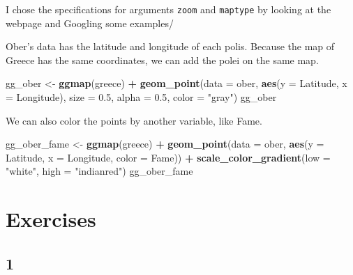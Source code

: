 \documentclass[]{book}
\newenvironment{Shaded}{\begin{snugshade}}{\end{snugshade}}
\newcommand{\DataTypeTok}[1]{\textcolor[rgb]{0.13,0.29,0.53}{#1}}
\newcommand{\FloatTok}[1]{\textcolor[rgb]{0.00,0.00,0.81}{#1}}
\newcommand{\KeywordTok}[1]{\textcolor[rgb]{0.13,0.29,0.53}{\textbf{#1}}}
\newcommand{\NormalTok}[1]{#1}
\newcommand{\OperatorTok}[1]{\textcolor[rgb]{0.81,0.36,0.00}{\textbf{#1}}}
\newcommand{\StringTok}[1]{\textcolor[rgb]{0.31,0.60,0.02}{#1}}
\theoremstyle{definition}
\theoremstyle{definition}
\theoremstyle{definition}
\theoremstyle{remark}
\begin{document}
I chose the specifications for arguments \texttt{zoom} and \texttt{maptype} by looking at the webpage and Googling some examples/

Ober's data has the latitude and longitude of each polis. Because the map of Greece has the same coordinates, we can add the polei on the same map.

\begin{Shaded}
\begin{Highlighting}[]
\NormalTok{gg_ober <-}\StringTok{ }\KeywordTok{ggmap}\NormalTok{(greece) }\OperatorTok{+}
\StringTok{  }\KeywordTok{geom_point}\NormalTok{(}\DataTypeTok{data =}\NormalTok{ ober, }
             \KeywordTok{aes}\NormalTok{(}\DataTypeTok{y =}\NormalTok{ Latitude, }\DataTypeTok{x =}\NormalTok{ Longitude), }
             \DataTypeTok{size =} \FloatTok{0.5}\NormalTok{,}
             \DataTypeTok{alpha =} \FloatTok{0.5}\NormalTok{,}
             \DataTypeTok{color =} \StringTok{"gray"}\NormalTok{)}
\NormalTok{gg_ober}
\end{Highlighting}
\end{Shaded}

We can also color the points by another variable, like Fame.

\begin{Shaded}
\begin{Highlighting}[]
\NormalTok{gg_ober_fame <-}\StringTok{ }\KeywordTok{ggmap}\NormalTok{(greece) }\OperatorTok{+}
\StringTok{  }\KeywordTok{geom_point}\NormalTok{(}\DataTypeTok{data =}\NormalTok{ ober, }
             \KeywordTok{aes}\NormalTok{(}\DataTypeTok{y =}\NormalTok{ Latitude, }\DataTypeTok{x =}\NormalTok{ Longitude, }\DataTypeTok{color =}\NormalTok{ Fame)) }\OperatorTok{+}
\StringTok{  }\KeywordTok{scale_color_gradient}\NormalTok{(}\DataTypeTok{low =} \StringTok{"white"}\NormalTok{, }\DataTypeTok{high =} \StringTok{"indianred"}\NormalTok{)}
\NormalTok{gg_ober_fame}
\end{Highlighting}
\end{Shaded}

\hypertarget{exercises}{%
\section*{Exercises}\label{exercises}}

\hypertarget{section}{%
\subsection*{1}\label{section}}
\end{document}
